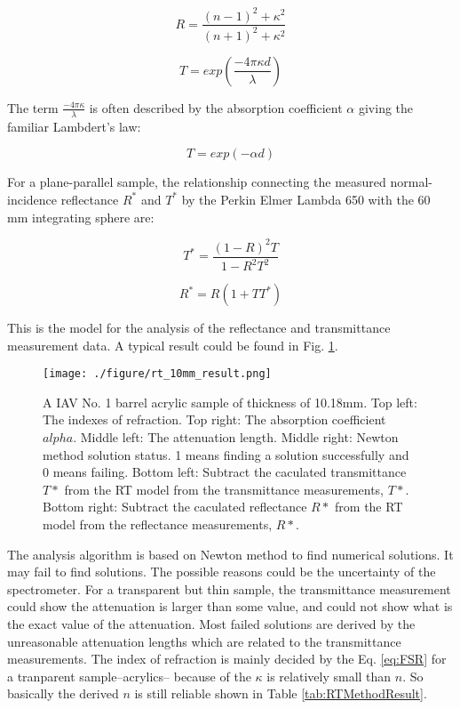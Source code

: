 \begin{equation}
\label{eq:FSR}
R = \frac{(n-1)^2 + \kappa^2}{(n+1)^2 + \kappa^2}
\end{equation}


\begin{equation}
\label{eq:IT}
T = exp(\frac{-4{\pi}{\kappa}d}{\lambda})
\end{equation}

The term $\frac{-4{\pi}{\kappa}}{\lambda}$ is often described by the absorption coefficient $\alpha$ giving the familiar Lambdert's law:

\begin{equation}
\label{eq:Lambdert}
T = exp(-{\alpha}d)
\end{equation}

For a plane-parallel sample, the relationship connecting the measured normal-incidence reflectance $R^*$ and $T^*$ by the
Perkin Elmer Lambda 650 with the 60 mm integrating sphere are:


\begin{equation}
\label{eq:TStar}
T^* = \frac{(1-R)^2T}{1-R^2T^2}
\end{equation}


\begin{equation}
\label{eq:RStar}
R^* = R(1+TT^*)
\end{equation}


This is the model for the analysis of the reflectance and transmittance measurement data.
A typical result could be found in Fig. \ref{fig:rt_10mm_result.png}.


\begin{figure}[p]
    \centering
    \texttt{[image: ./figure/rt\_10mm\_result.png]}
    \caption[Result of RT method]
{A IAV No. 1 barrel acrylic sample of thickness of 10.18mm.
Top left: The indexes of refraction.
Top right: The absorption coefficient $alpha$.
Middle left: The attenuation length.
Middle right: Newton method solution status. 1 means finding a solution successfully and 0 means failing.
Bottom left: Subtract the caculated transmittance $T*$ from the RT model from the transmittance measurements, $T*$.
Bottom right: Subtract the caculated reflectance $R*$ from the RT model from the reflectance measurements, $R*$.
}
    \label{fig:rt_10mm_result.png}
    \end{figure}

The analysis algorithm is based on Newton method to find numerical solutions. It may fail
to find solutions. The possible reasons could be the uncertainty of the spectrometer.
For a transparent but thin sample, the transmittance measurement could show the attenuation
is larger than some value, and could not show  what is the exact value of the attenuation.
Most failed solutions are derived by the unreasonable attenuation lengths which are related to the transmittance measurements.
The index of refraction is mainly decided by the Eq. \ref{eq:FSR} for a tranparent sample--acrylics-- because
of the $\kappa$ is relatively small than $n$. So basically the derived $n$ is still reliable shown in Table \ref{tab:RTMethodResult}.


